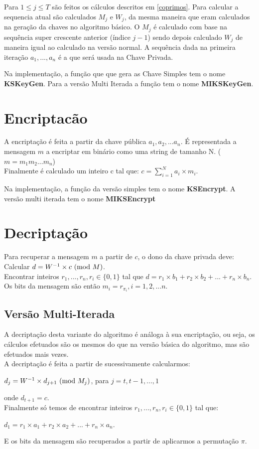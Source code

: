 \documentclass[11pt, language=portuguese]{report}
\begin{document}
Para $1 \le j \le T$ são feitos os cálculos descritos em \ref{coprimos}. Para calcular a sequencia atual são calculados $M_j$ e $W_j$, da mesma maneira que eram calculados na geração da chaves no algoritmo básico. O $M_j$ é calculado com base na sequência super crescente anterior (índice $j-1$) sendo depois calculado $W_j$ de maneira igual ao calculado na versão normal. A sequência dada na primeira iteração ${a_1, ..., a_n}$ é a que será usada na Chave Privada.

Na implementação, a função que que gera as Chave Simples tem o nome \textbf{KSKeyGen}. Para a versão Multi Iterada a função tem o nome \textbf{MIKSKeyGen}.
\section{Encriptacão}
A encriptação é feita a partir da chave pública $a_1, a_2, ... a_n$. É representada a mensagem $m$ a encriptar em binário como uma string de tamanho N. ($m = m_1 m_2 ... m_n$)
\\
Finalmente é calculado um inteiro c tal que:
    $c = \sum_{i = 1}^{N} a_i \times m_i$.


Na implementação, a função da versão simples tem o nome \textbf{KSEncrypt}. A versão multi iterada tem o nome \textbf{MIKSEncrypt}

\section{Decriptação}
Para recuperar a mensagem $m$ a partir de $c$, o dono da chave privada deve:
Calcular $d = W^{-1}\times c \ (\mathrm{mod}\ M)$.
\\
Encontrar inteiros ${r_1, ..., r_n}, r_i \in \{0,1\}$ tal que $d = r_1 \times b_1 + r_2 \times b_2 + ... + r_n \times b_n$.
\\
Os bits da mensagem são então $m_i = r_{\pi_i}, i = 1, 2, ... n$.
\subsection{Versão Multi-Iterada}
A decriptação desta variante do algoritmo é análoga à sua encriptação, ou seja, os cálculos efetuados são os mesmos do que na versão básica do algoritmo, mas são efetuados mais vezes.
\\
A decriptação é feita a partir de sucessivamente calcularmos:
\begin{center}
	$d_j = W^{-1}\times d_{j+1} \ (\mathrm{mod}\ M_j)$, para $j = {t, t-1, ..., 1}$
\end{center}
onde $d_{t+1} = c$.
\\
Finalmente só temos de encontrar inteiros ${r_1, ..., r_n}, r_i \in \{0,1\}$ tal que:
\begin{center}
    $d_1 = r_1\times a_1 + r_2\times a_2 + ... + r_n\times a_n$.
\end{center}
E os bits da mensagem são recuperados a partir de aplicarmos a permutação $\pi$.
\end{document}
